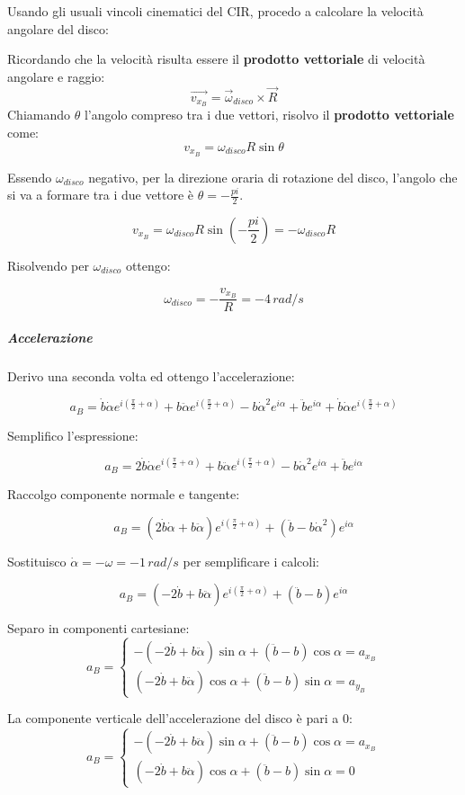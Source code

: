 \documentclass[main.tex]{subfiles}
\begin{document}
Usando gli usuali vincoli cinematici del CIR, procedo a calcolare la velocità angolare del disco:

Ricordando che la velocità risulta essere il \textbf{prodotto vettoriale} di velocità angolare e raggio:
\[
	\vec{v_{x_B}} = \vec{\omega}_{disco}\times\vec{R}
\]
Chiamando $\theta$ l'angolo compreso tra i due vettori, risolvo il \textbf{prodotto vettoriale} come:
\[
	v_{x_B} = \omega_{disco}R\sin\theta
\]

Essendo $\omega_{disco}$ negativo, per la direzione oraria di rotazione del disco, l'angolo che si va a formare tra i due vettore è $\theta=-\frac{pi}{2}$.

\[
	v_{x_B} = \omega_{disco}R\sin(-\frac{pi}{2}) = -\omega_{disco}R
\]

Risolvendo per $\omega_{disco}$ ottengo:

\[
	\omega_{disco} = -\frac{v_{x_B} }{R} = -4\,rad/s
\]

\subparagraph{Accelerazione}
Derivo una seconda volta ed ottengo l'accelerazione:

\[
	a_B =  \dot{b}\dot{\alpha}e^{i(\frac{\pi}{2}+\alpha)} + b\ddot{\alpha}e^{i(\frac{\pi}{2}+\alpha)} - b\dot{\alpha}^2e^{i\alpha} + \ddot{b}e^{i\alpha} + \dot{b}\dot{\alpha}e^{i(\frac{\pi}{2}+\alpha)}
\]

Semplifico l'espressione:

\[
	a_B =  2\dot{b}\dot{\alpha}e^{i(\frac{\pi}{2}+\alpha)} + b\ddot{\alpha}e^{i(\frac{\pi}{2}+\alpha)} - b\dot{\alpha}^2e^{i\alpha} + \ddot{b}e^{i\alpha}
\]

Raccolgo componente normale e tangente:

\[
	a_B =  (2\dot{b}\dot{\alpha} + b\ddot{\alpha})e^{i(\frac{\pi}{2}+\alpha)} +(\ddot{b}- b\dot{\alpha}^2)e^{i\alpha}
\]

Sostituisco $\dot{\alpha} = -\omega = -1\,rad/s$ per semplificare i calcoli:

\[
	a_B =  (-2\dot{b} + b\ddot{\alpha})e^{i(\frac{\pi}{2}+\alpha)} +(\ddot{b}- b)e^{i\alpha}
\]

Separo in componenti cartesiane:
\[
a_B = \begin{cases}
	-(-2\dot{b} + b\ddot{\alpha})\sin\alpha + (\ddot{b}- b)\cos\alpha = a_{x_B}\\
	(-2\dot{b} + b\ddot{\alpha})\cos\alpha + (\ddot{b}- b)\sin\alpha = a_{y_B}
\end{cases}
\]

La componente verticale dell'accelerazione del disco è pari a 0:
\[
a_B = \begin{cases}
	-(-2\dot{b} + b\ddot{\alpha})\sin\alpha + (\ddot{b}- b)\cos\alpha = a_{x_B}\\
	(-2\dot{b} + b\ddot{\alpha})\cos\alpha + (\ddot{b}- b)\sin\alpha = 0
\end{cases}
\]
\end{document}
